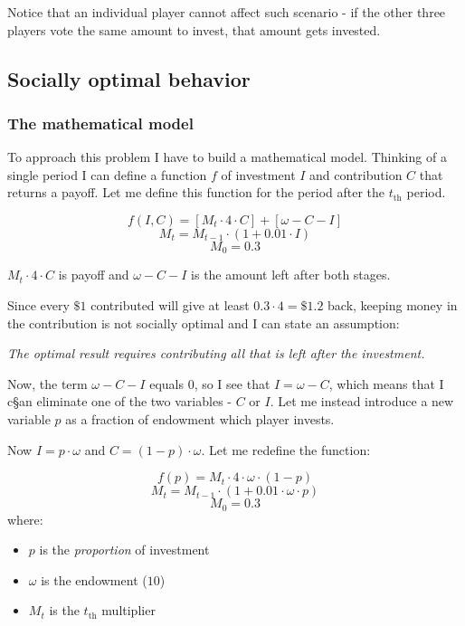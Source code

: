 			Notice that an individual player cannot affect such scenario - if the other three players vote the same amount to invest, that amount gets invested.

	\subsection{Socially optimal behavior}
	
		\subsubsection{The mathematical model}
	
			To approach this problem I have to build a mathematical model. Thinking of a single period I can define a function $f$ of investment $I$ and contribution $C$ that returns a payoff. Let me define this function for the period after the $t_\text{th}$ period.
			
			\[
				f(I, C) = [M_t \cdot 4 \cdot C] + [\omega - C - I]
			\]
			\[
				M_t = M_{t-1} \cdot (1 + 0.01 \cdot I)
			\]
			\[
				M_0 = 0.3
			\]

			$M_t \cdot 4 \cdot C$ is payoff and $\omega - C - I$ is the amount left after both stages.
			
			Since every $\$1$ contributed will give at least $0.3 \cdot 4 = \$1.2$ back, keeping money in the contribution is not socially optimal and I can state an assumption:
			
			\begin{displayquote}
				\emph{
					The optimal result requires contributing all that is left after the investment.
				} 
			\end{displayquote} 
		
			Now, the term $\omega - C - I$ equals $0$, so I see that $I = \omega - C$, which means that I c§an eliminate one of the two variables - $C$ or $I$.	Let me instead introduce a new variable $p$ as a fraction of endowment which player invests.

			Now $I = p \cdot \omega$ and $C = (1-p) \cdot \omega$. Let me redefine the function:
			
			\[
				f(p) = M_t \cdot 4 \cdot \omega \cdot (1 - p)
			\]
			\[
				M_t = M_{t-1} \cdot (1 + 0.01 \cdot \omega \cdot p)
			\]
			\[
				M_0 = 0.3
			\]
			where:
			\begin{itemize}
				\item
					$p$ is the \emph{proportion} of investment
				\item 
					$\omega$ is the endowment ($10$)
				\item
					$M_t$ is the $t_\text{th}$ multiplier
			\end{itemize}
		
